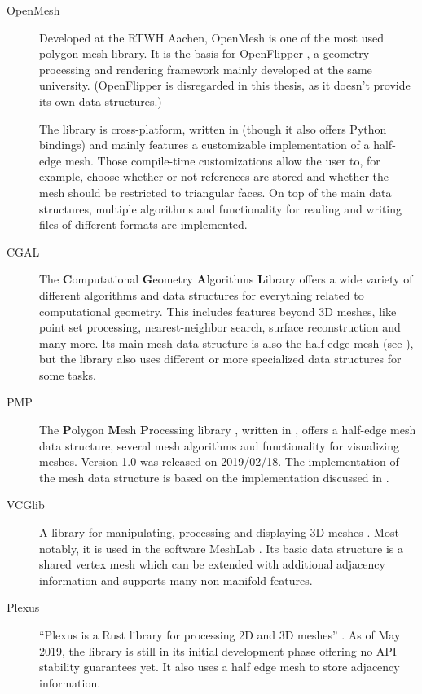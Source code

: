 \begin{description}
  \item [OpenMesh] Developed at the RTWH Aachen, OpenMesh \cite{botsch2002openmesh,openmeshhomepage} is one of the most used polygon mesh library.
  It is the basis for OpenFlipper \cite{mobius2010openflipper, openflipperhomepage}, a geometry processing and rendering framework mainly developed at the same university.
  (OpenFlipper is disregarded in this thesis, as it doesn't provide its own data structures.)

  The library is cross-platform, written in \cpp (though it also offers Python bindings) and mainly features a customizable implementation of a half-edge mesh.
  Those compile-time customizations allow the user to, for example, choose whether or not  references are stored and whether the mesh should be restricted to triangular faces.
  On top of the main data structures, multiple algorithms and functionality for reading and writing files of different formats are implemented.

  \item [CGAL] The \textbf{C}omputational \textbf{G}eometry \textbf{A}lgorithms \textbf{L}ibrary \cite{cgalhomepage} offers a wide variety of different algorithms and data structures for everything related to computational geometry.
  This includes features beyond 3D meshes, like point set processing, nearest-neighbor search, surface reconstruction and many more.
  Its main mesh data structure is also the half-edge mesh (see \cite{cgal:k-hds-19a, cgal:bsmf-sm-19a}), but the library also uses different or more specialized data structures for some tasks.

  \item [PMP] The \textbf{P}olygon \textbf{M}esh \textbf{P}rocessing library \cite{pmp-library}, written in \cpp, offers a half-edge mesh data structure, several mesh algorithms and functionality for visualizing meshes.
  Version 1.0 was released on 2019/02/18.
  The implementation of the mesh data structure is based on the  implementation discussed in \cite{sieger2011design}.

  \item [VCGlib] A \cpp library for manipulating, processing and displaying 3D meshes \cite{vcglibhomepage}.
  Most notably, it is used in the software MeshLab \cite{meshlabhomepage}.
  Its basic data structure is a shared vertex mesh which can be extended with additional adjacency information and supports many non-manifold features.

  \item [Plexus] \enquote{Plexus is a Rust library for processing 2D and 3D meshes} \cite{plexus}.
  As of May 2019, the library is still in its initial development phase offering no API stability guarantees yet.
  It also uses a half edge mesh to store adjacency information.
\end{description}
